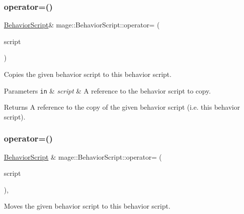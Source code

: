 \subsubsection{\texorpdfstring{operator=()}{operator=()}\hspace{0.1cm}{\footnotesize\ttfamily [1/2]}}
{\footnotesize\ttfamily \hyperlink{classmage_1_1_behavior_script}{Behavior\+Script}\& mage\+::\+Behavior\+Script\+::operator= (\begin{DoxyParamCaption}\item[{const \hyperlink{classmage_1_1_behavior_script}{Behavior\+Script} \&}]{script }\end{DoxyParamCaption})\hspace{0.3cm}{\ttfamily [delete]}}

Copies the given behavior script to this behavior script.


\begin{DoxyParams}[1]{Parameters}
\mbox{\tt in}  & {\em script} & A reference to the behavior script to copy. \\
\hline
\end{DoxyParams}
\begin{DoxyReturn}{Returns}
A reference to the copy of the given behavior script (i.\+e. this behavior script). 
\end{DoxyReturn}
\hypertarget{classmage_1_1_behavior_script_aefeae227ee8d2452bf05782604f5011e}{}\label{classmage_1_1_behavior_script_aefeae227ee8d2452bf05782604f5011e} 
\subsubsection{\texorpdfstring{operator=()}{operator=()}\hspace{0.1cm}{\footnotesize\ttfamily [2/2]}}
{\footnotesize\ttfamily \hyperlink{classmage_1_1_behavior_script}{Behavior\+Script} \& mage\+::\+Behavior\+Script\+::operator= (\begin{DoxyParamCaption}\item[{\hyperlink{classmage_1_1_behavior_script}{Behavior\+Script} \&\&}]{script }\end{DoxyParamCaption})\hspace{0.3cm}{\ttfamily [default]}, {\ttfamily [noexcept]}}

Moves the given behavior script to this behavior script.


